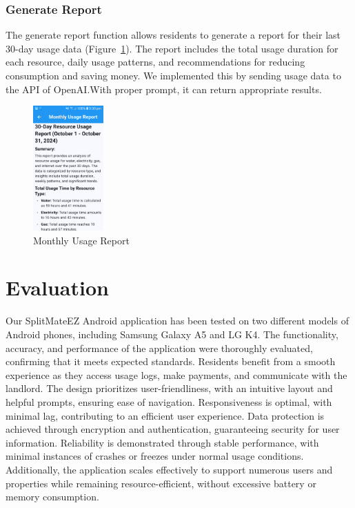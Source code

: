\documentclass[sigconf]{acmart}
\begin{document}
\subsubsection{Generate Report}
The generate report function allows residents to generate a report for their last 30-day usage data (Figure~\ref{fig:usageReport}). The report includes the total usage duration for each resource, daily usage patterns, and recommendations for reducing consumption and saving money. We implemented this by sending usage data to the API of OpenAI.\@ With proper prompt, it can return appropriate results.

\begin{figure}[h]
  \centering
  \includegraphics[width=0.24\textwidth]{usageReport.jpg}
  \caption{Monthly Usage Report}
  \label{fig:usageReport}
\end{figure}

\section{Evaluation}
Our SplitMateEZ Android application has been tested on two different models of Android phones, including Samsung Galaxy A5 and LG K4. The functionality, accuracy, and performance of the application were thoroughly evaluated, confirming that it meets expected standards. Residents benefit from a smooth experience as they access usage logs, make payments, and communicate with the landlord. The design prioritizes user-friendliness, with an intuitive layout and helpful prompts, ensuring ease of navigation. Responsiveness is optimal, with minimal lag, contributing to an efficient user experience. Data protection is achieved through encryption and authentication, guaranteeing security for user information. Reliability is demonstrated through stable performance, with minimal instances of crashes or freezes under normal usage conditions. Additionally, the application scales effectively to support numerous users and properties while remaining resource-efficient, without excessive battery or memory consumption.
\end{document}
